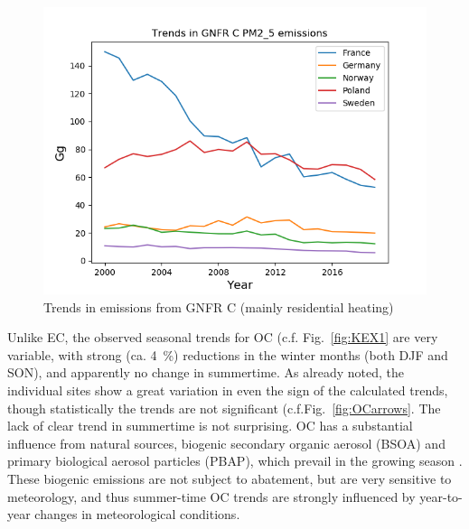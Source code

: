 \begin{figure}
    \centering
    \includegraphics[width=12cm,trim=0 0 0 1.5cm,clip]{FIGS_TRENDS/PlotEmisTrends_PM2_5.png}
    \caption{Trends in \pmfine emissions from GNFR C (mainly residential heating)}
    \label{fig:gnfrCtrends}
\end{figure}

 

Unlike EC, the observed seasonal trends for OC (c.f. Fig.~\ref{fig:KEX1} are very variable, with strong (ca. 4~\%) reductions in the winter months (both DJF and SON), and apparently no change in summertime. As already noted, the individual sites show a great variation in even the sign of the calculated trends, though statistically the trends are not significant (c.f.Fig.~\ref{fig:OCarrows}. The lack of clear trend in summertime is not surprising. 
OC has a substantial influence from
natural sources, biogenic secondary organic aerosol (BSOA) and primary
biological aerosol particles (PBAP), which prevail in the growing season \citep[e.g.][]{Gelencser:CARB,Yttri2019}.
These biogenic emissions are not subject to abatement, but are very sensitive to meteorology, and thus summer-time OC trends are strongly influenced by year-to-year changes in meteorological conditions.

